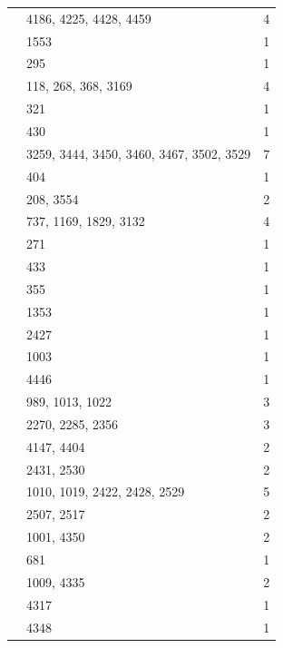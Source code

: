 \begin{longtable}{@{}p{}p{}p{}@{}}
\cite[Theorem~3.2]{Shoji1995II} & 4186, 4225, 4428, 4459 & 4 \\
\cite[Corollary~6.3]{Spath2013} & 1553 & 1 \\
\cite[Definition~2.1]{Spath2013} & 295 & 1 \\
\cite[Definition~4.1]{Spath2013} & 118, 268, 368, 3169 & 4 \\
\cite[Definition~4.1(i)--(iv)]{Spath2013} & 321 & 1 \\
\cite[Proposition~4.6(a)--(c)]{Spath2013} & 430 & 1 \\
\cite[Proposition~6.2]{Spath2013} & 3259, 3444, 3450, 3460, 3467, 3502, 3529 & 7 \\
\cite[Remark~5.18]{Spath2013} & 404 & 1 \\
\cite[Theorem~A]{Spath2013} & 208, 3554 & 2 \\
\cite[Theorem~C]{Spath2013} & 737, 1169, 1829, 3132 & 4 \\
\cite[p.~184]{Spath2013} & 271 & 1 \\
\cite[Proposition~3.6(b) and Theorem~3.5(b)]{Spath2017Triples} & 433 & 1 \\
\cite[Theorem~4.4]{Spath2017Triples} & 355 & 1 \\
\cite[Theorem~3.3]{Spath2025Extensions} & 1353 & 1 \\
\cite[(3.2)]{Taylor2013} & 2427 & 1 \\
\cite[Definition~2.1]{Taylor2013} & 1003 & 1 \\
\cite[Proposition~2.4]{Taylor2013} & 4446 & 1 \\
\cite[Proposition~5.4]{Taylor2013} & 989, 1013, 1022 & 3 \\
\cite[Section~2]{Taylor2013} & 2270, 2285, 2356 & 3 \\
\cite[Theorem~1.1]{Taylor2013} & 4147, 4404 & 2 \\
\cite[Theorem~3.1]{Taylor2013} & 2431, 2530 & 2 \\
\cite[Theorem~3.2]{Taylor2013} & 1010, 1019, 2422, 2428, 2529 & 5 \\
\cite[pp.~45--46]{Taylor2013} & 2507, 2517 & 2 \\
\cite[proof of Proposition~2.4]{Taylor2013} & 1001, 4350 & 2 \\
\cite[10.1--10.3]{Taylor2014Maximal} & 681 & 1 \\
\cite[10.3]{Taylor2014Maximal} & 1009, 4335 & 2 \\
\cite[6.19]{Taylor2014Maximal} & 4317 & 1 \\
\cite[7.1 and Proposition~10.2]{Taylor2014Maximal} & 4348 & 1 \\

\end{longtable}
